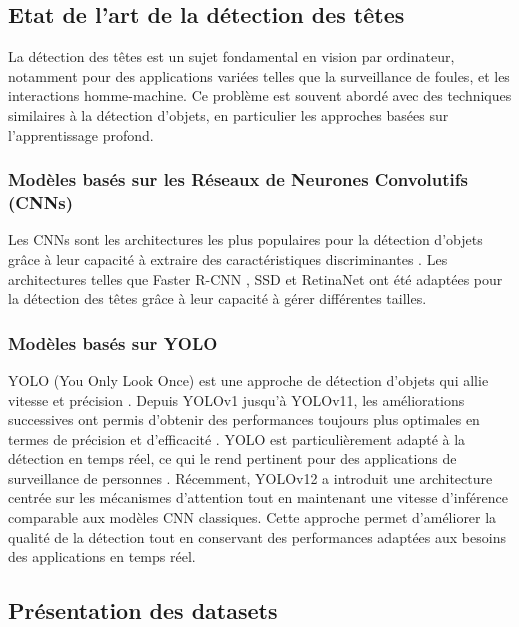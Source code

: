 \subsection{\textbf{Etat de l'art de la détection des têtes}}

La détection des têtes est un sujet fondamental en vision par ordinateur, notamment pour des applications variées telles que la surveillance de foules, et les interactions homme-machine. Ce problème est souvent abordé avec des techniques similaires à la détection d'objets, en particulier les approches basées sur l'apprentissage profond.

\subsubsection{\textbf{Modèles basés sur les Réseaux de Neurones Convolutifs (CNNs)}}
Les CNNs sont les architectures les plus populaires pour la détection d'objets grâce à leur capacité à extraire des caractéristiques discriminantes \cite{lecun1998gradient}. Les architectures telles que Faster R-CNN \cite{ren2015faster}, SSD \cite{liu2016ssd} et RetinaNet \cite{lin2017focal} ont été adaptées pour la détection des têtes grâce à leur capacité à gérer différentes tailles.

\subsubsection{\textbf{Modèles basés sur YOLO}}
YOLO (You Only Look Once) est une approche de détection d'objets qui allie vitesse et précision \cite{redmon2016you}. Depuis YOLOv1 jusqu'à YOLOv11, les améliorations successives ont permis d'obtenir des performances toujours plus optimales en termes de précision et d'efficacité \cite{bochkovskiy2020yolov4, jocher2023ultralytics}. YOLO est particulièrement adapté à la détection en temps réel, ce qui le rend pertinent pour des applications de surveillance de personnes \cite{ge2019efficient, lian2021locating}. 
Récemment, YOLOv12 \cite{tian2025yolov12attentioncentricrealtimeobject} a introduit une architecture centrée sur les mécanismes d'attention tout en maintenant une vitesse d'inférence comparable aux modèles CNN classiques. Cette approche permet d'améliorer la qualité de la détection tout en conservant des performances adaptées aux besoins des applications en temps réel.


\subsection{Présentation des datasets}

